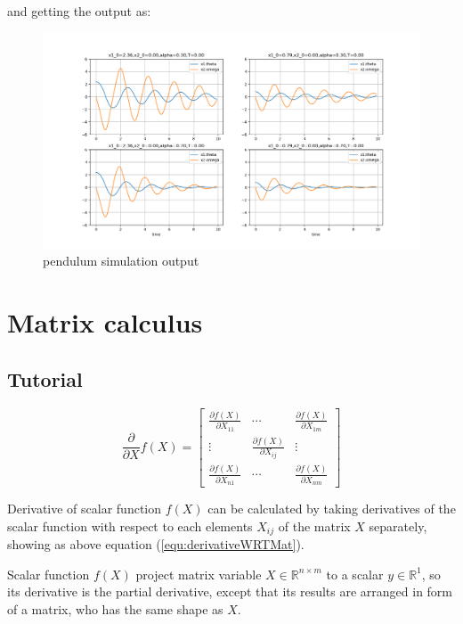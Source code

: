 \documentclass[titlepage]{article}
\begin{document}
and getting the output as:
\begin{figure}[htbp]
    \centering
    \includegraphics[width=\textwidth]{img/pendulumSim.png}
    \caption{pendulum simulation output}
    \label{fig:pendulumSim}
\end{figure}

\section{Matrix calculus}

\subsection{Tutorial}

\begin{equation}
    \frac{\partial}{\partial X}f(X) = 
    \begin{bmatrix}
        \frac{\partial f(X)}{\partial X_{11}} & \cdots & \frac{\partial f(X)}{\partial X_{1m}} \\
        \vdots & \frac{\partial f(X)}{\partial X_{ij}} & \vdots \\
        \frac{\partial f(X)}{\partial X_{n1}} & \cdots & \frac{\partial f(X)}{\partial X_{nm}}
    \end{bmatrix}
    \label{equ:derivativeWRTMat}
\end{equation}

Derivative of scalar function $f(X)$ can be calculated 
by taking derivatives of the scalar function with respect to 
each elements $X_{ij}$ of the matrix $X$ separately, showing 
as above equation (\ref{equ:derivativeWRTMat}). 

Scalar function $f(X)$ project matrix variable 
$X\in\mathbb{R}^{n\times m}$ to a scalar $y\in\mathbb{R}^{1}$,
so its derivative is the partial derivative, except that 
its results are arranged in form of a matrix, who has the same shape as $X$.
\end{document}
